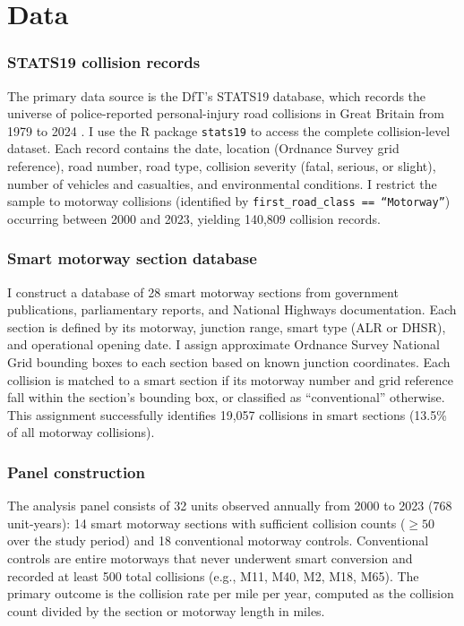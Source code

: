\documentclass[12pt]{article}
\begin{document}
\section{Data}

\subsubsection*{STATS19 collision records} The primary data source is the DfT's STATS19 database, which records the universe of police-reported personal-injury road collisions in Great Britain from 1979 to 2024 \citep{dft_stats19_2024}. I use the R package \texttt{stats19} \citep{lovelace_stats19_2019} to access the complete collision-level dataset. Each record contains the date, location (Ordnance Survey grid reference), road number, road type, collision severity (fatal, serious, or slight), number of vehicles and casualties, and environmental conditions. I restrict the sample to motorway collisions (identified by \texttt{first\_road\_class == ``Motorway''}) occurring between 2000 and 2023, yielding 140,809 collision records.

\subsubsection*{Smart motorway section database} I construct a database of 28 smart motorway sections from government publications, parliamentary reports, and National Highways documentation. Each section is defined by its motorway, junction range, smart type (ALR or DHSR), and operational opening date. I assign approximate Ordnance Survey National Grid bounding boxes to each section based on known junction coordinates. Each collision is matched to a smart section if its motorway number and grid reference fall within the section's bounding box, or classified as ``conventional'' otherwise. This assignment successfully identifies 19,057 collisions in smart sections (13.5\% of all motorway collisions).

\subsubsection*{Panel construction} The analysis panel consists of 32 units observed annually from 2000 to 2023 (768 unit-years): 14 smart motorway sections with sufficient collision counts ($\geq 50$ over the study period) and 18 conventional motorway controls. Conventional controls are entire motorways that never underwent smart conversion and recorded at least 500 total collisions (e.g., M11, M40, M2, M18, M65). The primary outcome is the collision rate per mile per year, computed as the collision count divided by the section or motorway length in miles.
\end{document}
